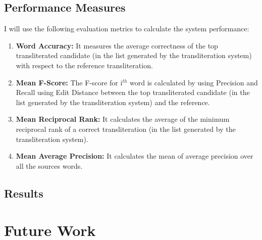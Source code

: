 \documentclass[11pt,a4paper]{article}
\begin{document}
\subsection{Performance Measures}
I will use the following evaluation metrics to calculate the system performance:
\begin{enumerate}
\item \textbf{Word Accuracy: } It measures the average correctness of the top transliterated candidate (in the list generated by the transliteration system) with respect to the reference transliteration.
\item \textbf{Mean F-Score: } The F-score for i$^{th}$ word is calculated by using Precision and Recall using Edit Distance between the top transliterated candidate (in the list generated by the transliteration system) and the reference.
\item \textbf{Mean Reciprocal Rank: } It calculates the average of the minimum reciprocal rank of a correct transliteration (in the list generated by the transliteration system).
\item \textbf{Mean Average Precision: } It calculates the mean of average precision over  all the sources words.
\end{enumerate}
\subsection{Results}

\section{Future Work}
\end{document}
